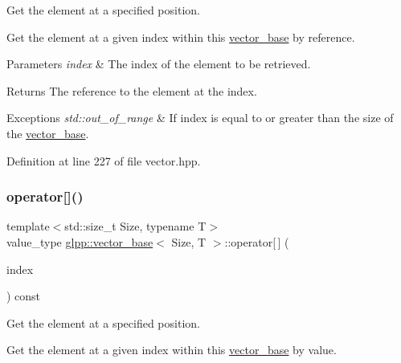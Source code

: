Get the element at a specified position. 

Get the element at a given index within {\ttfamily this} \hyperlink{classglpp_1_1vector__base}{vector\+\_\+base} by reference.


\begin{DoxyParams}{Parameters}
{\em index} & The index of the element to be retrieved. \\
\hline
\end{DoxyParams}
\begin{DoxyReturn}{Returns}
The reference to the element at the {\ttfamily index}. 
\end{DoxyReturn}

\begin{DoxyExceptions}{Exceptions}
{\em std\+::out\+\_\+of\+\_\+range} & If {\ttfamily index} is equal to or greater than the size of the \hyperlink{classglpp_1_1vector__base}{vector\+\_\+base}. \\
\hline
\end{DoxyExceptions}


Definition at line 227 of file vector.\+hpp.

\mbox{\label{classglpp_1_1vector__base_a3b38ee9887188a71120db98da6795cd3}} 
\subsubsection{\texorpdfstring{operator[]()}{operator[]()}\hspace{0.1cm}{\footnotesize\ttfamily [2/2]}}
{\footnotesize\ttfamily template$<$std\+::size\+\_\+t Size, typename T$>$ \\
value\+\_\+type \hyperlink{classglpp_1_1vector__base}{glpp\+::vector\+\_\+base}$<$ Size, T $>$\+::operator\mbox{[}$\,$\mbox{]} (\begin{DoxyParamCaption}\item[{const std\+::size\+\_\+t}]{index }\end{DoxyParamCaption}) const\hspace{0.3cm}{\ttfamily [inline]}}



Get the element at a specified position. 

Get the element at a given index within this \hyperlink{classglpp_1_1vector__base}{vector\+\_\+base} by value.

